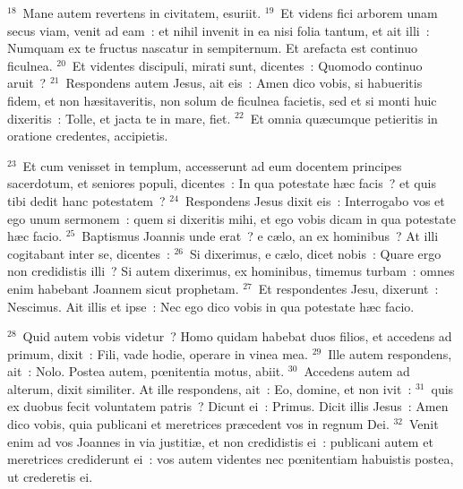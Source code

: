 ${}^{18}$~Mane autem revertens in civitatem, esuriit.
${}^{19}$~Et videns fici arborem unam secus viam, venit ad eam~: et nihil invenit in ea nisi folia tantum, et ait illi~: Numquam ex te fructus nascatur in sempiternum. Et arefacta est continuo ficulnea.
${}^{20}$~Et videntes discipuli, mirati sunt, dicentes~: Quomodo continuo aruit~?
${}^{21}$~Respondens autem Jesus, ait eis~: Amen dico vobis, si habueritis fidem, et non h\ae sitaveritis, non solum de ficulnea facietis, sed et si monti huic dixeritis~: Tolle, et jacta te in mare, fiet.
${}^{22}$~Et omnia qu\ae cumque petieritis in oratione credentes, accipietis.


${}^{23}$~Et cum venisset in templum, accesserunt ad eum docentem principes sacerdotum, et seniores populi, dicentes~: In qua potestate h\ae c facis~? et quis tibi dedit hanc potestatem~?
${}^{24}$~Respondens Jesus dixit eis~: Interrogabo vos et ego unum sermonem~: quem si dixeritis mihi, et ego vobis dicam in qua potestate h\ae c facio.
${}^{25}$~Baptismus Joannis unde erat~? e c\ae lo, an ex hominibus~? At illi cogitabant inter se, dicentes~:
${}^{26}$~Si dixerimus, e c\ae lo, dicet nobis~: Quare ergo non credidistis illi~? Si autem dixerimus, ex hominibus, timemus turbam~: omnes enim habebant Joannem sicut prophetam.
${}^{27}$~Et respondentes Jesu, dixerunt~: Nescimus. Ait illis et ipse~: Nec ego dico vobis in qua potestate h\ae c facio.


${}^{28}$~Quid autem vobis videtur~? Homo quidam habebat duos filios, et accedens ad primum, dixit~: Fili, vade hodie, operare in vinea mea.
${}^{29}$~Ille autem respondens, ait~: Nolo. Postea autem, pœnitentia motus, abiit.
${}^{30}$~Accedens autem ad alterum, dixit similiter. At ille respondens, ait~: Eo, domine, et non ivit~:
${}^{31}$~quis ex duobus fecit voluntatem patris~? Dicunt ei~: Primus. Dicit illis Jesus~: Amen dico vobis, quia publicani et meretrices pr\ae cedent vos in regnum Dei.
${}^{32}$~Venit enim ad vos Joannes in via justiti\ae , et non credidistis ei~: publicani autem et meretrices crediderunt ei~: vos autem videntes nec pœnitentiam habuistis postea, ut crederetis ei.


